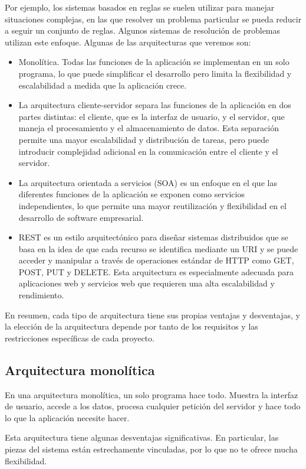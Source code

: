 Por ejemplo, los sistemas basados en reglas se suelen utilizar para manejar situaciones complejas, en las que resolver un problema particular se pueda reducir a seguir un conjunto de reglas. Algunos sistemas de resolución de problemas utilizan este enfoque.
Algunas de las arquitecturas que veremos son:
\begin{itemize}
	\item Monolítica. Todas las funciones de la aplicación se implementan en un solo programa, lo que puede simplificar el desarrollo pero limita la flexibilidad y escalabilidad a medida que la aplicación crece.
	\item La arquitectura cliente-servidor separa las funciones de la aplicación en dos partes distintas: el cliente, que es la interfaz de usuario, y el servidor, que maneja el procesamiento y el almacenamiento de datos. Esta separación permite una mayor escalabilidad y distribución de tareas, pero puede introducir complejidad adicional en la comunicación entre el cliente y el servidor.
	\item La arquitectura orientada a servicios (SOA) es un enfoque en el que las diferentes funciones de la aplicación se exponen como servicios independientes, lo que permite una mayor reutilización y flexibilidad en el desarrollo de software empresarial.
	\item REST es un estilo arquitectónico para diseñar sistemas distribuidos que se basa en la idea de que cada recurso se identifica mediante un URI y se puede acceder y manipular a través de operaciones estándar de HTTP como GET, POST, PUT y DELETE. Esta arquitectura es especialmente adecuada para aplicaciones web y servicios web que requieren una alta escalabilidad y rendimiento.
\end{itemize}

En resumen, cada tipo de arquitectura tiene sus propias ventajas y desventajas, y la elección de la arquitectura depende por tanto de los requisitos y las restricciones específicas de cada proyecto.
\subsection{Arquitectura monolítica}
En una arquitectura monolítica, un solo programa hace todo. Muestra la interfaz de usuario, accede a los datos, procesa cualquier petición del servidor y hace todo lo que la aplicación necesite hacer.

Esta arquitectura tiene algunas desventajas significativas. En particular, las piezas del sistema están estrechamente vinculadas, por lo que no te ofrece mucha flexibilidad.

